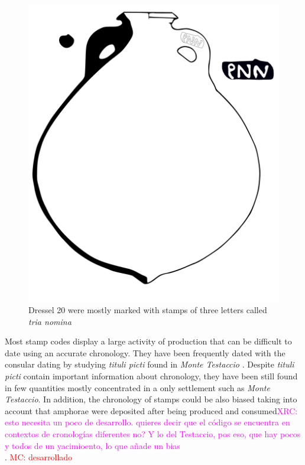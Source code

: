\documentclass[review]{elsarticle}
\newcommand{\memo}[2]{\textcolor{#1}{#2}}
\newcommand{\maria}[1]{\memo{red}{MC: #1\\}}
\newcommand{\xavi}[1]{\memo{magenta}{XRC: #1\\}}
\begin{document}
\begin{figure}[htp]
	\centering
\includegraphics[scale=0.5]{figs/dressel20}
\caption{Dressel 20 were mostly marked with stamps of three letters called \textit{tria nomina}}
\label{amphora}
\end{figure} 

Most stamp codes display a large activity of production that can be difficult to date using an accurate chronology. They have been frequently dated with the consular dating by studying \textit{tituli picti} found in \textit{Monte Testaccio} \citep{Testaccio1, berni_millet_epigrafianforica_2008}.
Despite \textit{tituli picti} contain important information about chronology, they have been still found in few quantities mostly concentrated in a only settlement such as \textit{Monte Testaccio}. In addition, the chronology of stamps could be also biased taking into account that amphorae were deposited after being produced and consumed\xavi{esto necesita un poco de desarrollo. quieres decir que el código se encuentra en contextos de cronologías diferentes no? Y lo del Testaccio, pos eso, que hay pocos y todos de un yacimioento, lo que añade un bias}. 
\maria{desarrollado} 
\end{document}
